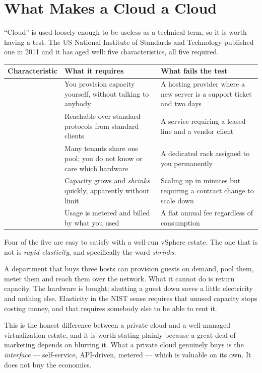 \section{What Makes a Cloud a Cloud}

``Cloud'' is used loosely enough to be useless as a technical term, so it is
worth having a test. The US National Institute of Standards and Technology
published one in 2011 and it has aged well: five characteristics, all five
required.

\begin{longtable}{@{}L{3.7cm}L{5.6cm}L{5.2cm}@{}}
\toprule
{}
\textbf{Characteristic} & \textbf{What it requires} & \textbf{What fails the
test} \\
\midrule
\endhead
{} & You provision capacity yourself, without
talking to anybody & A hosting provider where a new server is a support ticket
and two days \\
 & Reachable over standard protocols from standard
clients & A service requiring a leased line and a vendor client \\
 & Many tenants share one pool; you do not know or care
which hardware & A dedicated rack assigned to you permanently \\
 & Capacity grows and \emph{shrinks} quickly, apparently
without limit & Scaling up in minutes but requiring a contract change to scale
down \\
 & Usage is metered and billed by what you used &
A flat annual fee regardless of consumption \\
\bottomrule
\end{longtable}

\begin{conceptbox}
Four of the five are easy to satisfy with a well-run vSphere estate. The one
that is not is \emph{rapid elasticity}, and specifically the word
\emph{shrinks}.

\smallskip
A department that buys three hosts can provision guests on demand, pool them,
meter them and reach them over the network. What it cannot do is return
capacity. The hardware is bought; shutting a guest down saves a little
electricity and nothing else. Elasticity in the NIST sense requires that unused
capacity stops costing money, and that requires somebody else to be able to
rent it.

\smallskip
This is the honest difference between a private cloud and a well-managed
virtualization estate, and it is worth stating plainly because a great deal of
marketing depends on blurring it. What a private cloud genuinely buys is the
\emph{interface} --- self-service, API-driven, metered --- which is valuable on
its own. It does not buy the economics.
\end{conceptbox}

